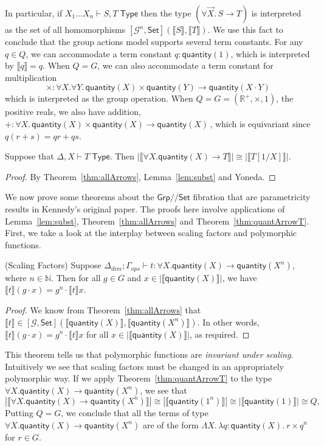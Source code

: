 \documentclass[a4paper,UKenglish]{lipics}
\theoremstyle{plain}
\newcommand{\msf}[1]{\mathsf{#1}} %
\newcommand{\Grp}{\msf{Grp}}
\newcommand{\Set}{\msf{Set}}
\newcommand{\GroupSet}[1]{[#1,\Set]}
\newcommand{\Lslice}[1]{#1/\!/\Set}
\newcommand{\GrpSet}{\Lslice{\Grp}}
\newcommand{\sem}[1]{\ensuremath{\llbracket #1 \rrbracket}}
\newcommand{\qnt}{\msf{quantity}}
\newcommand{\Deltadim}{\ensuremath{\Delta_{dim}}}
\newcommand{\Gammaops}{\ensuremath{\Gamma_{ops}}}
\newcommand{\Tj}[2]{#1 \vdash #2 \; \msf{ Type}}
\begin{document}
In particular, if $\Tj{X_1\dots X_n} {S,T}$ then
the type $(\forall \vec X.\,S\to T)$ is interpreted as the set
of all homomorphisms $\GroupSet {\mathcal G^n}(\sem S,\sem T)$.
We use this fact to conclude that the group actions model supports
several term constants. For any $q\in Q$, we can accommodate
a term constant $q:\qnt(1)$, which is interpreted by $\sem q=q$.
When $Q=G$,
we can also accommodate a term constant for multiplication
\[\times :\forall X.\forall Y.\,\qnt(X)\times\qnt(Y)\to\qnt(X\cdot Y)\]
which is interpreted as the group operation.
When $Q=G=(\mathbb R^+,\times,1)$, the positive reals,
we also have addition,
\ $+ :\forall X.\,\qnt(X)\times\qnt(X)\to\qnt(X)$\,,
which is equivariant since $q(r+s)=qr+qs$.
\begin{theorem}
\label{thm:quantArrowT}
Suppose that $\Delta, X \vdash T \; \msf{ Type}$. Then $|\sem{\forall
  X . \qnt(X) \rightarrow T}| \cong |\sem{T[1/X]}|$.
\end{theorem}
\begin{proof}
 By Theorem~\ref{thm:allArrows}, Lemma~\ref{lem:subst} and Yoneda.
\end{proof}



We now prove some theorems about the $\GrpSet$ fibration that are parametricity results in Kennedy's original paper. The proofs here involve applications of Lemma~\ref{lem:subst}, Theorem~\ref{thm:allArrows} and Theorem~\ref{thm:quantArrowT}. First, we take a look at the interplay between scaling factors and polymorphic functions.

\begin{theorem}(Scaling Factors)
\label{thm:ScalFact}
Suppose $\Deltadim; \Gammaops \vdash t : \forall X. \qnt(X) \rightarrow \qnt(X^n)$, where $n\in \mathbb{N}$. Then for all $g \in G$ and $x \in |\sem{\qnt(X)}|$,
we have $\sem{t} (g \cdot x) = g^n \cdot \sem{t} x$.
\end{theorem}
\begin{proof}
We know from Theorem~\ref{thm:allArrows} that
$\sem{t} \in \GroupSet{\mathcal{G}}(\sem{\qnt(X)},\sem{\qnt(X^n)})$.
In other words, $\sem{t} (g \cdot x) = g^n \cdot \sem{t} x$ for all $x \in |\sem{\qnt(X)}|$, as required.
\end{proof}
This theorem tells us that polymorphic functions are \emph{invariant under scaling}. Intuitively we see that scaling factors must be changed in an appropriately polymorphic way.
%
If we apply Theorem~\ref{thm:quantArrowT} to the type $\forall X. \qnt(X)\rightarrow \qnt(X^n)$, we see that
\[
 |\sem{\forall X. \qnt(X)\rightarrow \qnt(X^n)}| \cong |\sem{\qnt(1^n)}| \cong |\sem{\qnt(1)}| \cong Q \text{,}
\]
Putting $Q=G$, we conclude that all the terms of type $\forall X. \qnt(X)\rightarrow \qnt(X^n)$
are of the form $\Lambda X.\,\lambda q:\qnt(X).\ r\times q^n$
for $r\in G$.
\end{document}
